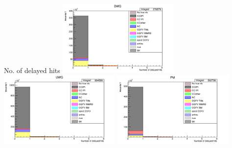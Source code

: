 \documentclass{beamer}
\begin{document}
\begin{frame}{No. of delayed hits}
    \includegraphics[width=0.45\textwidth]{images/num_reco_delayed_hits_wgbm_topo_DWG_accum_level[][26]_data_mc.png}
    \includegraphics[width=0.45\textwidth]{images/num_reco_delayed_hits_wgbm_topo_UWG_accum_level[][16]_data_mc.png}
    \includegraphics[width=0.45\textwidth]{images/num_reco_delayed_hits_wgbm_topo_PM_accum_level[][06]_data_mc.png}
\end{frame}
\end{document}
